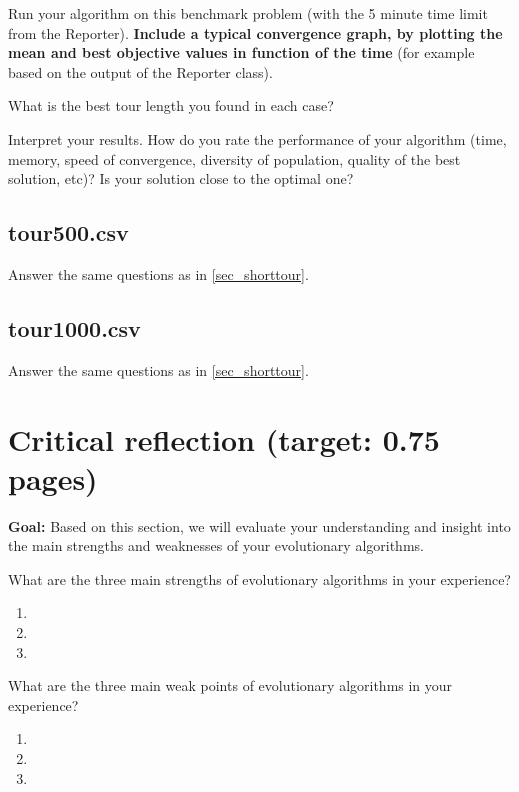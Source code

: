 \documentclass[a4paper,10pt]{article}
\newcommand{\ReplaceMe}[1]{{\color{blue}#1}}
\newcommand{\RemoveMe}[1]{{\color{purple}#1}}
\begin{document}
\ReplaceMe{Run your algorithm on this benchmark problem (with the 5 minute time limit from the Reporter). \textbf{Include a typical convergence graph, by plotting the mean and best objective values in function of the time} (for example based on the output of the Reporter class).

What is the best tour length you found in each case? 

Interpret your results. How do you rate the performance of your algorithm (time, memory, speed of convergence, diversity of population, quality of the best solution, etc)? Is your solution close to the optimal one?}

\subsection{tour500.csv}

\ReplaceMe{Answer the same questions as in \cref{sec_shorttour}.}

\subsection{tour1000.csv}

\ReplaceMe{Answer the same questions as in \cref{sec_shorttour}.}

\section{Critical reflection (target: 0.75 pages)}

\RemoveMe{\textbf{Goal:} Based on this section, we will evaluate your understanding and insight into the main strengths and weaknesses of your evolutionary algorithms.}

\ReplaceMe{What are the three main strengths of evolutionary algorithms in your experience?}

\begin{enumerate}
 \item 
 \item 
 \item 
\end{enumerate}

\ReplaceMe{What are the three main weak points of evolutionary algorithms in your experience?}

\begin{enumerate}
 \item 
 \item 
 \item 
\end{enumerate}
\end{document}
